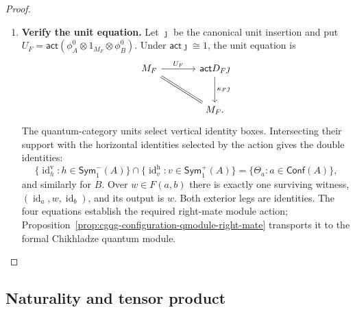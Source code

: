 \documentclass[oneside]{article}
\newcommand{\Conf}{\mathsf{Conf}}
\newcommand{\Sym}{\mathsf{Sym}}
\newcommand{\id}{\operatorname{id}}
\newcommand{\act}{\mathsf{act}}
\theoremstyle{plain}
\theoremstyle{definition}
\theoremstyle{remark}
\begin{document}
\begin{proof}
\begin{enumerate}[beginpenalty=10000]
        \item \textbf{Verify the unit equation.}
        Let \(\jmath\) be the canonical unit insertion and put
        \(U_F=\act(\phi_A^0\otimes1_{M_F}\otimes\phi_B^0)\). Under
        \(\act\jmath\cong1\), the unit equation is
        \[
        \begin{tikzcd}[column sep=large,row sep=large]
        M_F\arrow[r,"U_F"]\arrow[dr,equal]
          &\act D_F\jmath\arrow[d,"\kappa_F\jmath"]\\
          &M_F.
        \end{tikzcd}
        \]
        The quantum-category units select vertical identity boxes.
        Intersecting their support with the horizontal identities
        selected by the action gives the double identities:
        \[
        \{\id_h^{\mathrm v}:h\in\Sym^-_1(A)\}
        \cap\{\id_v^{\mathrm h}:v\in\Sym^+_1(A)\}
          =\{\Theta_a:a\in \Conf(A)\},
        \]
        and similarly for \(B\). Over \(w\in F(a,b)\) there is
        exactly one surviving witness, \((\id_a,w,\id_b)\), and
        its output is \(w\). Both exterior legs are identities.
        The four equations establish the required right-mate module action;
        Proposition~\ref{prop:cgqg-configuration-qmodule-right-mate}
        transports it to the formal Chikhladze quantum module. \qedhere
    \end{enumerate}
\end{proof}

\subsection{Naturality and tensor product}
\end{document}
